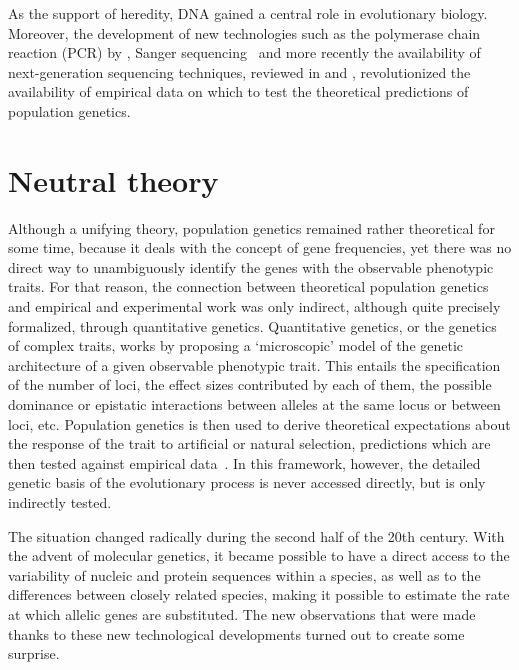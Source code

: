 As the support of heredity, \acrshort{DNA} gained a central role in evolutionary biology.
Moreover, the development of new technologies such as the polymerase chain reaction (\acrshort{PCR}) by \citet{Kleppe1971}, Sanger sequencing~\citep{Sanger1975, Sanger1977} and more recently the availability of next-generation sequencing techniques, reviewed in \citet{Mardis2008} and \citet{Levy2016}, revolutionized the availability of empirical data on which to test the theoretical predictions of population genetics.


\section{Neutral theory}

Although a unifying theory, population genetics remained rather theoretical for some time, because it deals with the concept of gene frequencies, yet there was no direct way to unambiguously identify the genes with the observable phenotypic traits.
For that reason, the connection between theoretical population genetics and empirical and experimental work was only indirect, although quite precisely formalized, through quantitative genetics.
Quantitative genetics, or the genetics of complex traits, works by proposing a ‘microscopic’ model of the genetic architecture of a given observable phenotypic trait.
This entails the specification of the number of loci, the effect sizes contributed by each of them, the possible dominance or epistatic interactions between alleles at the same locus or between loci, etc.
Population genetics is then used to derive theoretical expectations about the response of the trait to artificial or natural selection, predictions which are then tested against empirical data~\citep{Lande1976,Lande1980,Lande1983}.
In this framework, however, the detailed genetic basis of the evolutionary process is never accessed directly, but is only indirectly tested.

The situation changed radically during the second half of the 20th century.
With the advent of molecular genetics, it became possible to have a direct access to the variability of nucleic and protein sequences within a species, as well as to the differences between closely related species, making it possible to estimate the rate at which allelic genes are substituted.
The new observations that were made thanks to these new technological developments turned out to create some surprise.

